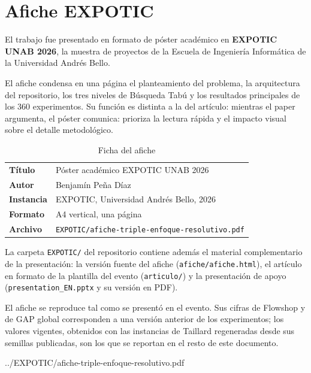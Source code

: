 \chapter{Afiche EXPOTIC}
\label{cap:afiche}

El trabajo fue presentado en formato de póster académico en \textbf{EXPOTIC
UNAB 2026}, la muestra de proyectos de la Escuela de Ingeniería Informática
de la Universidad Andrés Bello.

El afiche condensa en una página el planteamiento del problema, la
arquitectura del repositorio, los tres niveles de Búsqueda Tabú y los
resultados principales de los 360 experimentos. Su función es distinta a la
del artículo: mientras el paper argumenta, el póster comunica: prioriza la
lectura rápida y el impacto visual sobre el detalle metodológico.

\begin{table}[H]
\centering
\caption{Ficha del afiche}
\label{tab:ficha_afiche}
\small
\begin{tabular}{ll}
\toprule
\textbf{Título} & Póster académico EXPOTIC UNAB 2026 \\
\textbf{Autor} & Benjamín Peña Díaz \\
\textbf{Instancia} & EXPOTIC, Universidad Andrés Bello, 2026 \\
\textbf{Formato} & A4 vertical, una página \\
\textbf{Archivo} & \texttt{EXPOTIC/afiche-triple-enfoque-resolutivo.pdf} \\
\bottomrule
\end{tabular}
\end{table}

La carpeta \texttt{EXPOTIC/} del repositorio contiene además el material
complementario de la presentación: la versión fuente del afiche
(\texttt{afiche/afiche.html}), el artículo en formato de la plantilla del
evento (\texttt{articulo/}) y la presentación de apoyo
(\texttt{presentation\_EN.pptx} y su versión en PDF).

El afiche se reproduce tal como se presentó en el evento. Sus cifras de
Flowshop y de GAP global corresponden a una versión anterior de los
experimentos; los valores vigentes, obtenidos con las instancias de Taillard
regeneradas desde sus semillas publicadas, son los que se reportan en el
resto de este documento.

\cleardoublepage

%
           {../EXPOTIC/afiche-triple-enfoque-resolutivo.pdf}
